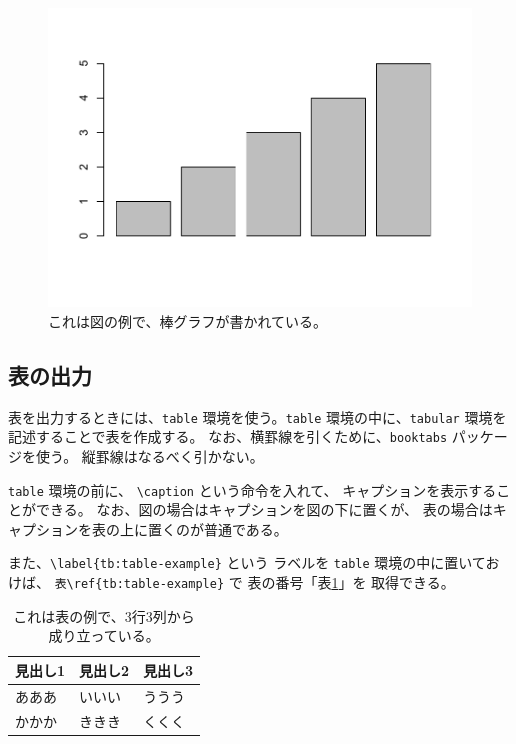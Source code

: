 \documentclass[ %
  uplatex,%
  a5paper,%
  papersize%
]{jsbook}
\begin{document}
\begin{figure}[h]
  \centering
  \includegraphics[width=0.8\hsize]{barplot01.pdf}
  \caption{これは図の例で、棒グラフが書かれている。}
  \label{fg:barplot-example}
\end{figure}


\subsection{表の出力}
表を出力するときには、\verb|table| 環境を使う。\verb|table| 環境の中に、\verb|tabular| 環境を記述することで表を作成する。
なお、横罫線を引くために、\texttt{booktabs} パッケージを使う。
縦罫線はなるべく引かない。


\verb|table| 環境の前に、
\verb|\caption| という命令を入れて、
キャプションを表示することができる。
なお、図の場合はキャプションを図の下に置くが、
表の場合はキャプションを表の上に置くのが普通である。

また、\verb|\label{tb:table-example}| という
ラベルを \verb|table| 環境の中に置いておけば、
\verb|表\ref{tb:table-example}| で
表の番号「表\ref{tb:table-example}」を
取得できる。

\begin{table}[h]
  \caption{これは表の例で、3行3列から成り立っている。}
  \label{tb:table-example}
  \begin{center}
    \begin{tabular}{lll} \toprule
      見出し1 & 見出し2 & 見出し3 \\ \midrule
      あああ & いいい & ううう \\
      かかか & ききき & くくく \\ \bottomrule
    \end{tabular}
  \end{center}
\end{table}
\end{document}
